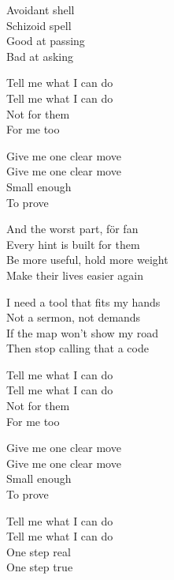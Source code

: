 \begin{lyrics}
Avoidant shell\\
Schizoid spell\\
Good at passing\\
Bad at asking

Tell me what I can do\\
Tell me what I can do\\
Not for them\\
For me too

Give me one clear move\\
Give me one clear move\\
Small enough\\
To prove

And the worst part, för fan\\
Every hint is built for them\\
Be more useful, hold more weight\\
Make their lives easier again

I need a tool that fits my hands\\
Not a sermon, not demands\\
If the map won't show my road\\
Then stop calling that a code

Tell me what I can do\\
Tell me what I can do\\
Not for them\\
For me too

Give me one clear move\\
Give me one clear move\\
Small enough\\
To prove

Tell me what I can do\\
Tell me what I can do\\
One step real\\
One step true
\end{lyrics}

